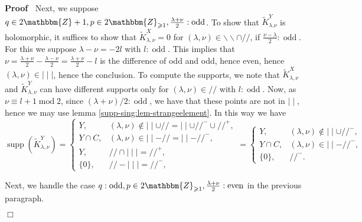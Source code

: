 \documentclass[12pt]{article}
\newcommand{\nin}{\not\in}
\newcommand{\tmop}[1]{\ensuremath{\operatorname{#1}}}
\renewenvironment{proof}{\noindent\textbf{Proof\ }}{\hspace*{\fill}$\Box$\medskip}
\theoremstyle{remark}
\begin{document}
\begin{proof}
  Next, we suppose $q \in 2\mathbbm{Z}+ 1, p \in 2\mathbbm{Z}_{\geqslant 1},
  \frac{\lambda + \nu}{2} : \tmop{odd}$. To show that $\tilde{K}_{\lambda .
  \nu}^Y$ is holomorphic, it suffices to show that $\tilde{K}_{\lambda, \nu}^X
  = 0$ for $(\lambda, \nu) \in \backslash\backslash \cap / /$, if $\frac{\nu -
  \lambda}{2} : \tmop{odd}$. For this we suppose $\lambda - \nu = - 2 l$ with
  $l : \tmop{odd}$. This implies that $\nu = \frac{\lambda + \nu}{2} -
  \frac{\lambda - \nu}{2} = \frac{\lambda + \nu}{2} - l$ is the difference of
  odd and odd, hence even, hence $(\lambda, \nu) \in \mid \mid \mid$, hence
  the conclusion. To compute the supports, we note that $\tilde{K}_{\lambda,
  \nu}^X$ and $\tilde{K}_{\lambda, \nu}^Y$ can have different supports only
  for $(\lambda, \nu) \in / /$ with $l : \tmop{odd}$. Now, as $\nu \equiv l +
  1 \tmop{mod} 2$, since $(\lambda + \nu) / 2 : \tmop{odd}$, we have that
  these points are not in $\mid \mid$, hence we may use lemma
  \ref{supp-sing:lem-strangeelement}. In this way we have
  \[ \tmop{supp} (\tilde{K}_{\lambda, \nu}^Y) = \left\{ \begin{array}{ll}
       Y, & (\lambda, \nu) \nin \mid \mid \cup / / = \mid \mid \cup / /^- \cup
       / /^+,\\
       Y \cap C, & (\lambda, \nu) \in \mid \mid - / / = \mid \mid - / /^-,\\
       Y, & / / \cap \mid \mid \mid = / /^+,\\
       \{ 0 \}, & / / - \mid \mid \mid = / /^-,
     \end{array} \right. = \left\{ \begin{array}{ll}
       Y, & (\lambda, \nu) \nin \mid \mid \cup / /^-,\\
       Y \cap C, & (\lambda, \nu) \in \mid \mid - / /^-,\\
       \{ 0 \}, & / /^- .
     \end{array} \right. \]
  
  
  Next, we handle the case $q : \tmop{odd}, p \in 2\mathbbm{Z}_{\geqslant 1},
  \frac{\lambda + \nu}{2} : \tmop{even}$ in the previous paragraph.
  

\end{proof}
\end{document}
